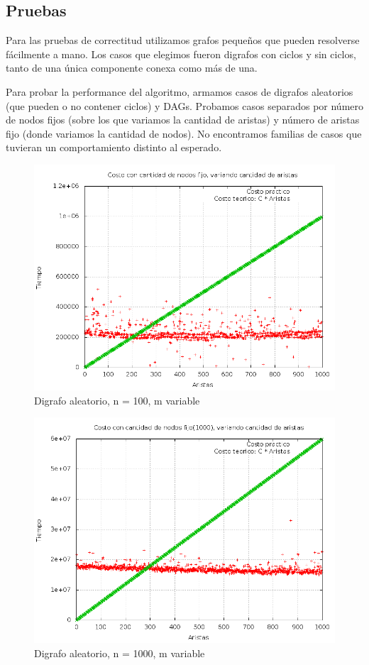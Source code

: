 \subsection{Pruebas}
Para las pruebas de correctitud utilizamos grafos peque\~nos que pueden resolverse f\'acilmente a mano. 
Los casos que elegimos fueron digrafos con ciclos y sin ciclos, tanto de una \'unica componente conexa como m\'as de una.


Para probar la performance del algoritmo, armamos casos de digrafos aleatorios (que pueden o no contener ciclos) y DAGs. Probamos casos separados por n\'umero de nodos fijos (sobre los que variamos la cantidad de aristas) y n\'umero de aristas fijo (donde variamos la cantidad de nodos). 
No encontramos familias de casos que tuvieran un comportamiento distinto al esperado.


\begin{figure}[H]
	\centering
	\includegraphics[scale=0.5]{dag_100.png}
	\caption{Digrafo aleatorio, n = 100, m variable}
\end{figure}

\begin{figure}[H]
	\centering
	\includegraphics[scale=0.5]{dag_1000.png}
	\caption{Digrafo aleatorio, n = 1000, m variable}
\end{figure}


